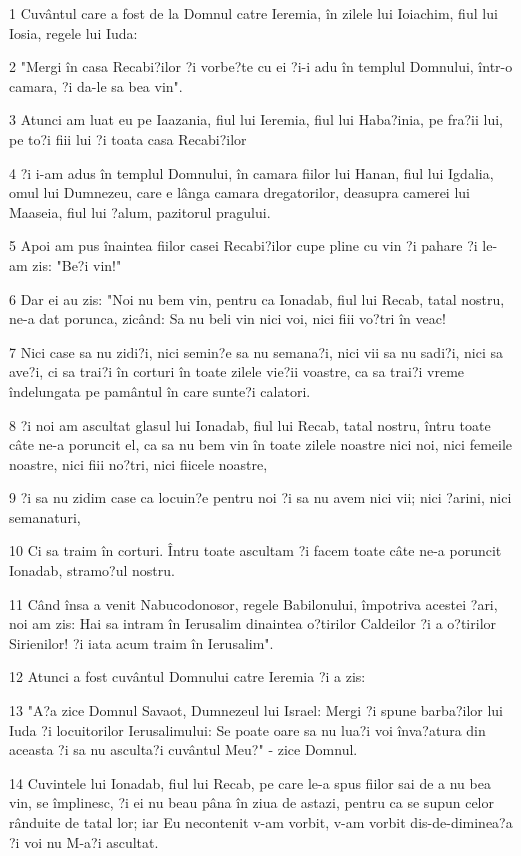 \par 1 Cuvântul care a fost de la Domnul catre Ieremia, în zilele lui Ioiachim, fiul lui Iosia, regele lui Iuda:
\par 2 "Mergi în casa Recabi?ilor ?i vorbe?te cu ei ?i-i adu în templul Domnului, într-o camara, ?i da-le sa bea vin".
\par 3 Atunci am luat eu pe Iaazania, fiul lui Ieremia, fiul lui Haba?inia, pe fra?ii lui, pe to?i fiii lui ?i toata casa Recabi?ilor
\par 4 ?i i-am adus în templul Domnului, în camara fiilor lui Hanan, fiul lui Igdalia, omul lui Dumnezeu, care e lânga camara dregatorilor, deasupra camerei lui Maaseia, fiul lui ?alum, pazitorul pragului.
\par 5 Apoi am pus înaintea fiilor casei Recabi?ilor cupe pline cu vin ?i pahare ?i le-am zis: "Be?i vin!"
\par 6 Dar ei au zis: "Noi nu bem vin, pentru ca Ionadab, fiul lui Recab, tatal nostru, ne-a dat porunca, zicând: Sa nu beli vin nici voi, nici fiii vo?tri în veac!
\par 7 Nici case sa nu zidi?i, nici semin?e sa nu semana?i, nici vii sa nu sadi?i, nici sa ave?i, ci sa trai?i în corturi în toate zilele vie?ii voastre, ca sa trai?i vreme îndelungata pe pamântul în care sunte?i calatori.
\par 8 ?i noi am ascultat glasul lui Ionadab, fiul lui Recab, tatal nostru, întru toate câte ne-a poruncit el, ca sa nu bem vin în toate zilele noastre nici noi, nici femeile noastre, nici fiii no?tri, nici fiicele noastre,
\par 9 ?i sa nu zidim case ca locuin?e pentru noi ?i sa nu avem nici vii; nici ?arini, nici semanaturi,
\par 10 Ci sa traim în corturi. Întru toate ascultam ?i facem toate câte ne-a poruncit Ionadab, stramo?ul nostru.
\par 11 Când însa a venit Nabucodonosor, regele Babilonului, împotriva acestei ?ari, noi am zis: Hai sa intram în Ierusalim dinaintea o?tirilor Caldeilor ?i a o?tirilor Sirienilor! ?i iata acum traim în Ierusalim".
\par 12 Atunci a fost cuvântul Domnului catre Ieremia ?i a zis:
\par 13 "A?a zice Domnul Savaot, Dumnezeul lui Israel: Mergi ?i spune barba?ilor lui Iuda ?i locuitorilor Ierusalimului: Se poate oare sa nu lua?i voi înva?atura din aceasta ?i sa nu asculta?i cuvântul Meu?" - zice Domnul.
\par 14 Cuvintele lui Ionadab, fiul lui Recab, pe care le-a spus fiilor sai de a nu bea vin, se împlinesc, ?i ei nu beau pâna în ziua de astazi, pentru ca se supun celor rânduite de tatal lor; iar Eu necontenit v-am vorbit, v-am vorbit dis-de-diminea?a ?i voi nu M-a?i ascultat.
